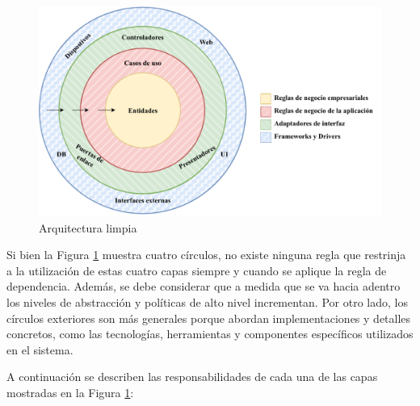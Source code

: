 \begin{figure}
    \centering
    \includegraphics[width=\textwidth]{Imagenes/Arquitectura de la aplicacion movil/Arquitectura Limpia.pdf}
    \caption{Arquitectura limpia}
    \label{fig:cleanArch}
\end{figure}

Si bien la Figura \ref{fig:cleanArch} muestra cuatro círculos, no existe ninguna regla que restrinja a la utilización de estas cuatro capas siempre y cuando se aplique la regla de dependencia. Además, se debe considerar que a medida que se va hacia adentro los niveles de abstracción y políticas de alto nivel incrementan. Por otro lado, los círculos exteriores son más generales porque abordan implementaciones y detalles concretos, como las tecnologías, herramientas y componentes específicos utilizados en el sistema.

A continuación se describen las responsabilidades de cada una de las capas mostradas en la Figura \ref{fig:cleanArch}:

